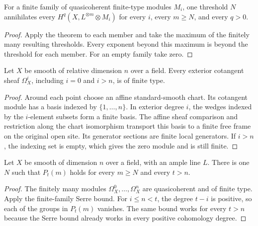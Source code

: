 \begin{corollary}
\label{cor:kn-finite-family-serre}
\leanok
For a finite family of quasicoherent finite-type modules $M_i$, one
threshold $N$ annihilates every $H^q(X,L^{\otimes m}\otimes M_i)$
for every $i$, every $m\geq N$, and every $q>0$.
\end{corollary}
\begin{proof}
Apply the theorem to each member and take the maximum of the finitely
many resulting thresholds.  Every exponent beyond this maximum is
beyond the threshold for each member.  For an empty family take zero.
\end{proof}

\begin{lemma}
\label{lem:kn-exterior-finite-type}
\leanok
Let $X$ be smooth of relative dimension $n$ over a field.  Every
exterior cotangent sheaf $\Omega_X^i$, including $i=0$ and $i>n$,
is of finite type.
\end{lemma}
\begin{proof}
Around each point choose an affine standard-smooth chart.  Its
cotangent module has a basis indexed by $\{1,\ldots,n\}$.  In exterior
degree $i$, the wedges indexed by the $i$-element subsets form a
finite basis.  The affine sheaf comparison and restriction along the
chart isomorphism transport this basis to a finite free frame on the
original open site.  Its generator sections are finite local
generators.  If $i>n$, the indexing set is empty, which gives the zero
module and is still finite.
\end{proof}

\begin{corollary}
\label{cor:kn-hodge-serre}
\leanok
Let $X$ be smooth of dimension $n$ over a field, with an ample line
$L$.  There is one $N$ such that $P_t(m)$ holds for every $m\geq N$
and every $t>n$.
\end{corollary}
\begin{proof}
The finitely many modules $\Omega_X^0,\ldots,\Omega_X^n$ are
quasicoherent and of finite type.  Apply the finite-family Serre bound.
For $i\leq n<t$, the degree $t-i$ is positive, so each of the groups
in $P_t(m)$ vanishes.  The same bound works for every $t>n$ because
the Serre bound already works in every positive cohomology degree.
\end{proof}

